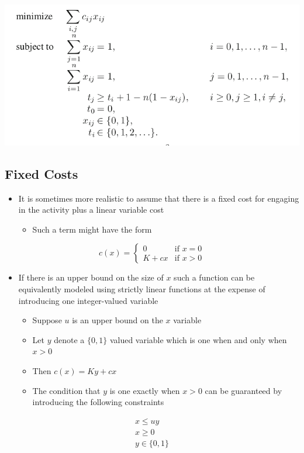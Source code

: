 \documentclass[11pt]{article}
\begin{document}
\begin{center}
\includegraphics[width=.9\linewidth]{Integer Programming/screenshot_2019-02-17_10-06-38.png}
\end{center}

\subsection{Fixed Costs}
\label{sec:orgbfc649c}
\begin{itemize}
\item It is sometimes more realistic to assume that there is a fixed cost for engaging in the activity plus a linear variable cost
\begin{itemize}
\item Such a term might have the form
\end{itemize}
\end{itemize}
\begin{equation*}
  c(x) =
    \begin{cases}
      \mbox{$0$} & \mbox{if $x=0$} \\
      \mbox{$K + cx$} & \mbox{if $x>0$}
    \end{cases}
\end{equation*}
\begin{itemize}
\item If there is an upper bound on the size of \(x\) such a function can be equivalently modeled using strictly linear functions at the expense of introducing one integer-valued variable
\begin{itemize}
\item Suppose \(u\) is an upper bound on the \(x\) variable
\item Let \(y\) denote a \(\{0,1\}\) valued variable which is one when and only when \(x > 0\)
\item Then \(c(x) = Ky + cx\)
\item The condition that \(y\) is one exactly when \(x>0\) can be guaranteed by introducing the following constraints
\end{itemize}
\end{itemize}
\begin{align*}
  x \leq uy \\
  x \geq 0 \\
  y \in \{0,1\} 
\end{align*}
\end{document}
